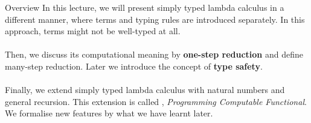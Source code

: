 \begin{frame}{Overview}
  In this lecture, we will present simply typed lambda calculus 
  in a different manner, where terms and typing rules are introduced
  separately. In this approach, terms might not be well-typed at all.
  \\~\\

  Then, we discuss its computational meaning by \textbf{one-step reduction} and
  define many-step reduction.  Later we introduce the concept of
  \textbf{type safety}. 
  \\~\\

  Finally, we extend simply typed lambda calculus with natural numbers
  and general recursion. This extension is called \PCF{}, \emph{Programming
    Computable Functional}. We formalise new features
  by what we have learnt later.
\end{frame}

